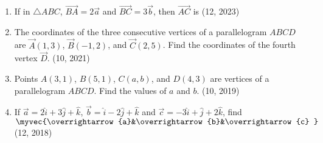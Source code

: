 \begin{enumerate}[label=\thesubsection.\arabic*, ref=\thesubsection.\theenumi]
    \item If in $\triangle ABC$, $\overrightarrow{BA} = 2\overrightarrow{a}$ and $\overrightarrow{BC} = 3\overrightarrow{b}$, then $\overrightarrow{AC}$ is
    \hfill (12, 2023)
	\item The coordinates of the three consecutive vertices of a parallelogram $ABCD$ are $\vec{A}(1, 3)$, $\vec{B}(-1, 2)$, and $\vec{C}(2, 5)$. Find the coordinates of the fourth vertex $\vec{D}$. \hfill (10, 2021)
\item Points $A(3, 1)$, $B(5, 1)$, $C(a, b)$, and $D(4, 3)$ are vertices of a parallelogram $ABCD$. Find the values of $a$ and $b$. \hfill (10, 2019)
\item If $\overrightarrow{a}=2\hat{i}+3\hat{j}+\hat{k}$, $\overrightarrow{b}=\hat{i}-2\hat{j}+\hat{k}$ and $\overrightarrow{c}=-3\hat{i}+\hat{j}+2\hat{k}$, find $\myvec{\overrightarrow{a}&\overrightarrow{b}&\overrightarrow{c} }$
\hfill (12, 2018) 
	
\end{enumerate}
